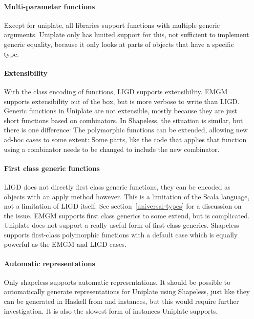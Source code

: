 \paragraph{Multi-parameter functions}
Except for uniplate, all libraries support functions with multiple generic
arguments. Uniplate only has limited support for this, not sufficient to
implement generic equality, because it only looks at parts of objects that
have a specific type.

\paragraph{Extensibility}
With the class encoding of functions, LIGD supports
extensibility. EMGM supports extensibility out of the box, but is more verbose
to write than LIGD. Generic functions in Uniplate are not extensible, mostly
because they are just short functions based on combinators. In Shapeless, the
situation is similar, but there is one difference: The polymorphic functions
can be extended, allowing new ad-hoc cases to some extent: Some parts, like
the code that applies that function using a combinator needs to be changed to
include the new combinator.

\paragraph{First class generic functions}
LIGD does not directly first class generic functions, they can be encoded as
objects with an apply method however. This is a limitation of the Scala
language, not a limitation of LIGD itself. See section~\ref{universal-types}
for a discussion on the issue. EMGM supports first class generics to some
extend, but is complicated. Uniplate does not support a really useful form
of first class generics. Shapeless supports first-class polymorphic functions
with a default case which is equally powerful as the EMGM and LIGD cases.

\paragraph{Automatic representations}
Only shapeless supports automatic representations. It should be possible to
automatically generate representations for Uniplate using Shapeless,
just like they can be generated in Haskell from  and 
instances, but this would require further investigation. It is also the slowest
form of instances Uniplate supports.

